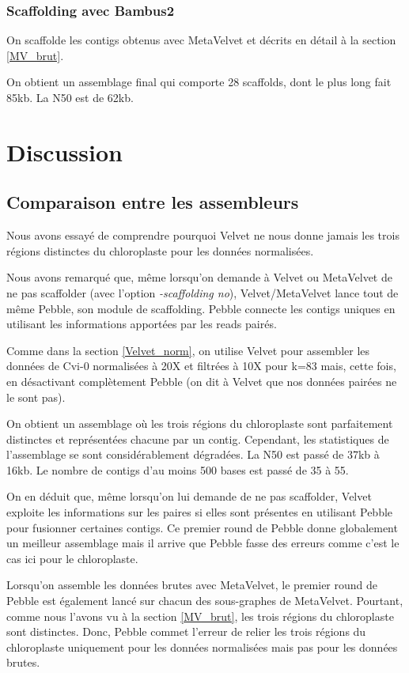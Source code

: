\documentclass[a4paper]{article}
\begin{document}
\subsubsection{Scaffolding avec Bambus2}

On scaffolde les contigs obtenus avec MetaVelvet et décrits en détail à la section \ref{MV_brut}.

On obtient un assemblage final qui comporte 28 scaffolds, dont le plus long fait 85kb. La N50 est de 62kb. 

 
\section{Discussion}

\subsection{Comparaison entre les assembleurs}

Nous avons essayé de comprendre pourquoi Velvet ne nous donne jamais les trois régions distinctes du chloroplaste pour les données normalisées. 

Nous avons remarqué que, même lorsqu'on demande à Velvet ou MetaVelvet de ne pas scaffolder (avec l'option \textit{-scaffolding no}), Velvet/MetaVelvet lance tout de même Pebble, son module de scaffolding. Pebble connecte les contigs uniques en utilisant les informations apportées par les reads pairés. 

Comme dans la section \ref{Velvet_norm}, on utilise Velvet pour assembler les données de Cvi-0 normalisées à 20X et filtrées à 10X pour k=83 mais, cette fois,  en désactivant complètement Pebble (on dit à Velvet que nos données pairées ne le sont pas). 

On obtient un assemblage où les trois régions du chloroplaste sont parfaitement distinctes et représentées chacune par un contig. Cependant, les statistiques de l'assemblage se sont considérablement dégradées. La N50 est passé de 37kb à 16kb. Le nombre de contigs d'au moins 500 bases est passé de 35 à 55. 

On en déduit que, même lorsqu'on lui demande de ne pas scaffolder, Velvet exploite les informations sur les paires si elles sont présentes en utilisant Pebble pour fusionner certaines contigs. Ce premier round de Pebble donne globalement un meilleur assemblage mais il arrive que Pebble fasse des erreurs comme c'est le cas ici pour le chloroplaste. 

Lorsqu'on assemble les données brutes avec MetaVelvet, le premier round de Pebble est également lancé sur chacun des sous-graphes de MetaVelvet. Pourtant, comme nous l'avons vu à la section \ref{MV_brut}, les trois régions du chloroplaste sont distinctes. Donc, Pebble commet l'erreur de relier les trois régions du chloroplaste uniquement pour les données normalisées mais pas pour les données brutes. 
\end{document}
